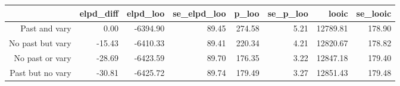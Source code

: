 \begin{table}[ht]
\centering
\begin{tabular}{rrrrrrrr}
  \hline
 & elpd\_diff & elpd\_loo & se\_elpd\_loo & p\_loo & se\_p\_loo & looic & se\_looic \\ 
  \hline
Past and vary & 0.00 & -6394.90 & 89.45 & 274.58 & 5.21 & 12789.81 & 178.90 \\ 
  No past but vary & -15.43 & -6410.33 & 89.41 & 220.34 & 4.21 & 12820.67 & 178.82 \\ 
  No past or vary & -28.69 & -6423.59 & 89.70 & 176.35 & 3.22 & 12847.18 & 179.40 \\ 
  Past but no vary & -30.81 & -6425.72 & 89.74 & 179.49 & 3.27 & 12851.43 & 179.48 \\ 
   \hline
\end{tabular}
\end{table}
